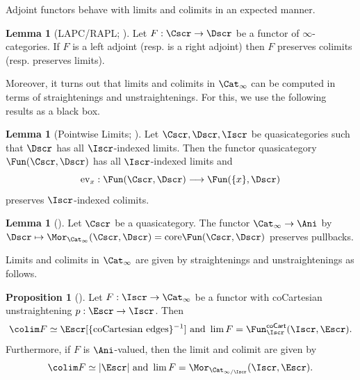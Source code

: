 \documentclass{amsart}
\theoremstyle{definition}
\newtheorem{lemma}[theorem]{Lemma}
\newtheorem{proposition}[theorem]{Proposition}
\numberwithin{equation}{section}
\begin{document}
Adjoint functors behave with limits and colimits in an expected manner.
\begin{lemma}[LAPC/RAPL; {\cite[Lem. 6.11]{Wagner}}]\label{lem: RAPL and LAPC}
  Let $F:\Cscr\to\Dscr$ be a functor of $\infty$-categories. If $F$ is a left adjoint (resp. is a right adjoint) then $F$ preserves colimits (resp. preserves limits).
\end{lemma}
Moreover, it turns out that limits and colimits in $\Cat_{\infty}$ can be computed in terms of straightenings and unstraightenings. For this, we use the following results as a black box.
\begin{lemma}[Pointwise Limits; {\cite[Lem. 6.12]{Wagner}}]\label{lem: pointwise limits}
  Let $\Cscr,\Dscr,\Iscr$ be quasicategories such that $\Dscr$ has all $\Iscr$-indexed limits. Then the functor quasicategory $\Fun(\Cscr,\Dscr)$ has all $\Iscr$-indexed limits and
  $$\mathrm{ev}_{x}:\Fun(\Cscr,\Dscr)\longrightarrow\Fun(\{x\},\Dscr)$$
  preserves $\Iscr$-indexed colimits.
\end{lemma}
\begin{lemma}[{\cite[Lem. 6.15]{Wagner}}]\label{lem: hom animae preserve pullbacks}
  Let $\Cscr$ be a quasicategory. The functor $\Cat_{\infty}\to\Ani$ by $\Dscr\mapsto\Mor_{\Cat_{\infty}}(\Cscr,\Dscr)=\mathrm{core}\Fun(\Cscr,\Dscr)$ preserves pullbacks.
\end{lemma}
Limits and colimits in $\Cat_{\infty}$ are given by straightenings and unstraightenings as follows.
\begin{proposition}[{\cite[Lem. 6.14]{Wagner}}]\label{prop: limits and colimits via straightening}
  Let $F:\Iscr\to\Cat_{\infty}$ be a functor with coCartesian unstraightening $p:\Escr\to\Iscr$. Then
  $$\colim F\simeq\Escr[\{\text{coCartesian edges}\}^{-1}]\text{ and }\lim F=\Fun_{\Iscr}^{\mathsf{coCart}}(\Iscr,\Escr).$$
  Furthermore, if $F$ is $\Ani$-valued, then the limit and colimit are given by
  $$\colim F\simeq|\Escr|\text{ and }\lim F=\Mor_{\Cat_{\infty/\Iscr}}(\Iscr,\Escr).$$
\end{proposition}
\end{document}
